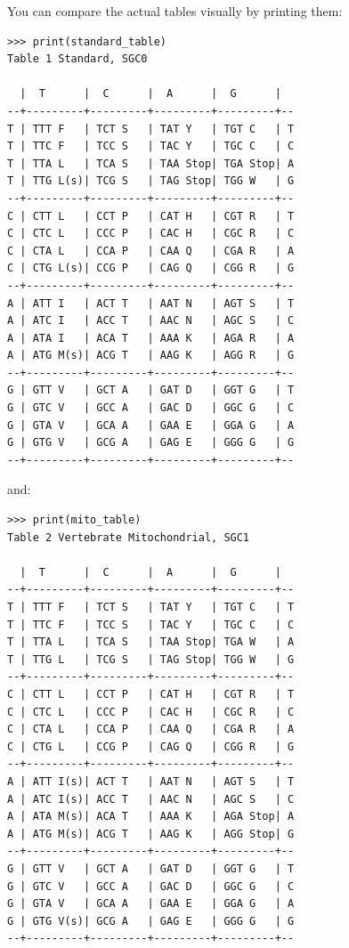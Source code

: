 \documentclass{report}
\begin{document}
You can compare the actual tables visually by printing them:
\begin{verbatim}
>>> print(standard_table)
Table 1 Standard, SGC0

  |  T      |  C      |  A      |  G      |
--+---------+---------+---------+---------+--
T | TTT F   | TCT S   | TAT Y   | TGT C   | T
T | TTC F   | TCC S   | TAC Y   | TGC C   | C
T | TTA L   | TCA S   | TAA Stop| TGA Stop| A
T | TTG L(s)| TCG S   | TAG Stop| TGG W   | G
--+---------+---------+---------+---------+--
C | CTT L   | CCT P   | CAT H   | CGT R   | T
C | CTC L   | CCC P   | CAC H   | CGC R   | C
C | CTA L   | CCA P   | CAA Q   | CGA R   | A
C | CTG L(s)| CCG P   | CAG Q   | CGG R   | G
--+---------+---------+---------+---------+--
A | ATT I   | ACT T   | AAT N   | AGT S   | T
A | ATC I   | ACC T   | AAC N   | AGC S   | C
A | ATA I   | ACA T   | AAA K   | AGA R   | A
A | ATG M(s)| ACG T   | AAG K   | AGG R   | G
--+---------+---------+---------+---------+--
G | GTT V   | GCT A   | GAT D   | GGT G   | T
G | GTC V   | GCC A   | GAC D   | GGC G   | C
G | GTA V   | GCA A   | GAA E   | GGA G   | A
G | GTG V   | GCG A   | GAG E   | GGG G   | G
--+---------+---------+---------+---------+--
\end{verbatim}
\noindent and:
\begin{verbatim}
>>> print(mito_table)
Table 2 Vertebrate Mitochondrial, SGC1

  |  T      |  C      |  A      |  G      |
--+---------+---------+---------+---------+--
T | TTT F   | TCT S   | TAT Y   | TGT C   | T
T | TTC F   | TCC S   | TAC Y   | TGC C   | C
T | TTA L   | TCA S   | TAA Stop| TGA W   | A
T | TTG L   | TCG S   | TAG Stop| TGG W   | G
--+---------+---------+---------+---------+--
C | CTT L   | CCT P   | CAT H   | CGT R   | T
C | CTC L   | CCC P   | CAC H   | CGC R   | C
C | CTA L   | CCA P   | CAA Q   | CGA R   | A
C | CTG L   | CCG P   | CAG Q   | CGG R   | G
--+---------+---------+---------+---------+--
A | ATT I(s)| ACT T   | AAT N   | AGT S   | T
A | ATC I(s)| ACC T   | AAC N   | AGC S   | C
A | ATA M(s)| ACA T   | AAA K   | AGA Stop| A
A | ATG M(s)| ACG T   | AAG K   | AGG Stop| G
--+---------+---------+---------+---------+--
G | GTT V   | GCT A   | GAT D   | GGT G   | T
G | GTC V   | GCC A   | GAC D   | GGC G   | C
G | GTA V   | GCA A   | GAA E   | GGA G   | A
G | GTG V(s)| GCG A   | GAG E   | GGG G   | G
--+---------+---------+---------+---------+--
\end{verbatim}
\end{document}
